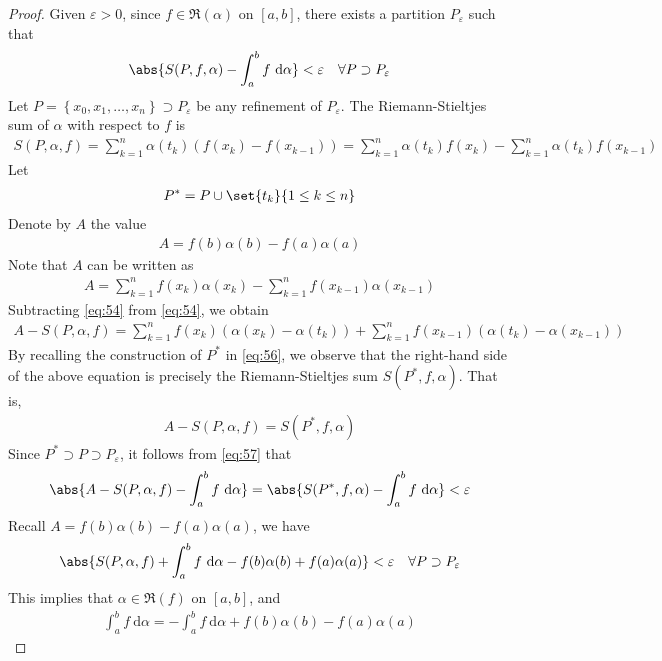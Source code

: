 \documentclass[thmcnt=section, 12pt]{elegantbook}
\begin{document}
\begin{proof}
    Given $\varepsilon > 0$, since $f \in \mathfrak{R}(\alpha)$ on $[a, b]$, there exists a partition $P_\varepsilon$ such that 
    \begin{align}
        \abs{S(P, f, \alpha) - \int_a^b f \ \mathrm{d}\alpha} < \varepsilon
        \quad \forall P \supset P_\varepsilon
        \label{eq:57}
    \end{align}
    Let $P = \left\{x_0, x_1, \ldots, x_n\right\} \supset P_\varepsilon$ be any refinement of $P_\varepsilon$. The Riemann-Stieltjes sum of $\alpha$ with respect to $f$ is 
    \begin{align}
        S(P, \alpha, f)
        = \sum_{k=1}^n \alpha(t_k) (f(x_k) - f(x_{k-1}))
        = \sum_{k=1}^n \alpha(t_k) f(x_k)
        - \sum_{k=1}^n \alpha(t_k) f(x_{k-1})
        \label{eq:54}
    \end{align}
    Let 
    \begin{align}
        P^\ast = P \cup \set{t_k}{1 \leq k \leq n}
        \label{eq:56}
    \end{align}
    Denote by $A$ the value 
    \begin{align*}
        A = f(b)\alpha(b) - f(a)\alpha(a)
    \end{align*}
    Note that $A$ can be written as 
    \begin{align}
        A = \sum_{k=1}^n f(x_k) \alpha(x_k)
        - \sum_{k=1}^n f(x_{k-1}) \alpha(x_{k-1})
        \label{eq:55}
    \end{align}
    Subtracting \eqref{eq:54} from \eqref{eq:54}, we obtain
    \begin{align*}
        A - S(P, \alpha, f)
        = \sum_{k=1}^n f(x_k) (\alpha(x_k) - \alpha(t_k))
        + \sum_{k=1}^n f(x_{k-1}) (\alpha(t_k) - \alpha(x_{k-1}))
    \end{align*}
    By recalling the construction of $P^\ast$ in \eqref{eq:56}, we observe that the right-hand side of the above equation is precisely the Riemann-Stieltjes sum $S(P^\ast, f, \alpha)$. That is, 
    \begin{align*}
        A - S(P, \alpha, f) = S(P^\ast, f, \alpha)
    \end{align*}
    Since $P^\ast \supset P \supset P_\varepsilon$, it follows from \eqref{eq:57} that 
    \begin{align*}
        \abs{A - S(P, \alpha, f) - \int_a^b f \ \mathrm{d}\alpha} 
        = \abs{S(P^\ast, f, \alpha) - \int_a^b f \ \mathrm{d}\alpha}
        < \varepsilon
    \end{align*}
    Recall $A = f(b)\alpha(b) - f(a)\alpha(a)$, we have 
    \begin{align*}
        \abs{S(P, \alpha, f) + \int_a^b f \ \mathrm{d}\alpha - f(b)\alpha(b) + f(a)\alpha(a)} < \varepsilon
        \quad \forall P \supset P_\varepsilon
    \end{align*}
    This implies that $\alpha \in \mathfrak{R}(f)$ on $[a, b]$, and 
    \begin{align*}
        \int_a^b f \ \mathrm{d}\alpha
        = -\int_a^b f \ \mathrm{d}\alpha 
        + f(b)\alpha(b) - f(a)\alpha(a)
    \end{align*}
\end{proof}
\end{document}
